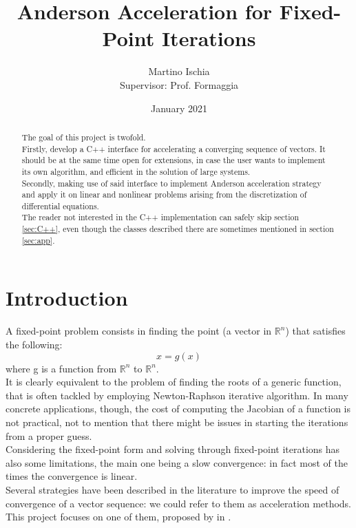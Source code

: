 \documentclass[12pt]{article}
\title
		{
		Anderson Acceleration for Fixed-Point Iterations
		}
\author{Martino Ischia\\ \footnotesize{Supervisor: Prof. Formaggia}}
\date{January 2021}
\begin{document}
		\maketitle
		\begin{abstract}
			\noindent The goal of this project is twofold.\\
			Firstly, develop a C++ interface for accelerating a converging sequence of vectors.
			It should be at the same time open for extensions, in case the user wants to implement its own algorithm,
			and efficient in the solution of large systems.\\
			Secondly, making use of said interface to implement Anderson acceleration strategy and apply it on
			linear and nonlinear problems arising from the discretization of differential equations.\\
			The reader not interested in the C++ implementation can safely skip section \ref{sec:C++}, even though
			the classes described there are sometimes mentioned in section \ref{sec:app}.
		\end{abstract}
		\tableofcontents
		\pagebreak
		
		
		\section{Introduction}
			A fixed-point problem consists in finding the point (a vector in $\mathbb{R}^n$) that satisfies the
			following:
			\begin{equation}
			x = g(x)
			\label{eq:g}
			\end{equation}
			where g is a function from $\mathbb{R}^n$ to $\mathbb{R}^n$.\\
			It is clearly equivalent to the problem of finding the roots of a generic function,
			that is often tackled by employing Newton-Raphson iterative algorithm.
			In many concrete applications, though, the cost of computing the Jacobian of a function
			is not practical, not to mention that there might be issues in starting the
			iterations from a proper guess.\\
			Considering the fixed-point form and solving through fixed-point iterations has also some limitations, the main one being
			a slow convergence: in fact most of the times the convergence is linear.\\
			Several strategies have been described in the literature to improve the speed
			of convergence of a vector sequence: we could refer to them as acceleration methods.
			This project focuses on one of them,
			proposed by \citeauthor{Anderson} \cite{Anderson} in \citeyear{Anderson}.
			
\end{document}
